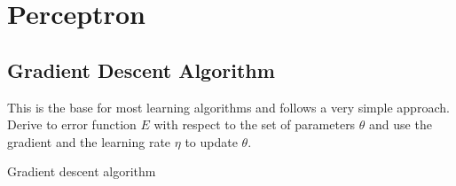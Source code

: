 \chapter{Perceptron}\label{chapter:perceptron}

\section{Gradient Descent Algorithm}
This is the base for most learning algorithms and follows a very simple approach. Derive to error function $E$ with respect to the set of parameters $\theta$ and use the gradient and the learning rate $\eta$ to update $\theta$.

\begin{algorithm}[H]
\caption{Gradient descent algorithm}
\end{algorithm}